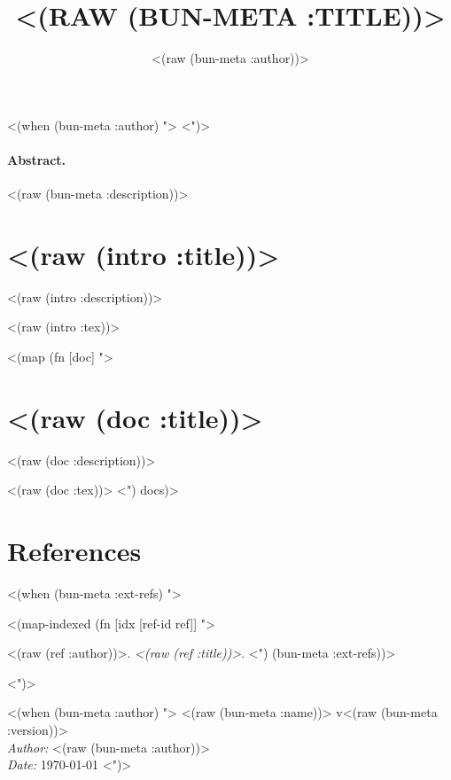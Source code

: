 \documentclass[a4paper,10pt]{article}
\author{<(raw (bun-meta :author))>}
\title{\uppercase{<(raw (bun-meta :title))>}}
\makeatletter
\def\maketitle{%
  \thispagestyle{empty}%
  \vskip 1cm
  \begin{center}
    \Large \strut \@title \par
  \end{center}
  \par
  <(when (bun-meta :author) ">
  <")>
  }
\makeatother
\begin{document}
\maketitle

\paragraph{Abstract.}
<(raw (bun-meta :description))>

\section*{<(raw (intro :title))>}

<(raw (intro :description))>

<(raw (intro :tex))>

<(map (fn [doc] ">
\section{<(raw (doc :title))>}

<(raw (doc :description))>

<(raw (doc :tex))>
<") docs)>

{\small
\section*{References}
<(when (bun-meta :ext-refs) ">
\begin{description}[leftmargin=3cm,style=nextline]
<(map-indexed
 (fn [idx [ref-id ref]] ">
\item[<(raw ref-id)>] <(raw (ref :author))>. \emph{<(raw (ref :title))>}.
<") (bun-meta :ext-refs))>
\end{description}
<")>
}

<(when (bun-meta :author) ">
\vspace{1.2em}
{\small
\noindent
<(raw (bun-meta :name))> v<(raw (bun-meta :version))>\\
\emph{Author:} <(raw (bun-meta :author))>\\
\emph{Date:} \today
}
<")>
\end{document}

